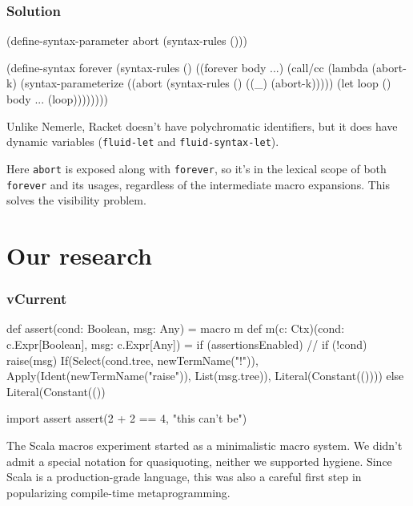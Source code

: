 \documentclass[hyperref={bookmarks=false}]{beamer}
\begin{document}
\begin{frame}[fragile]
\frametitle{Solution}

\begin{lstlistinglike}
\begin{semiverbatim}
(define-syntax-parameter abort (syntax-rules ()))

(define-syntax forever
  (syntax-rules ()
    ((forever body ...)
     (call/cc
      (lambda (abort-k)
        (syntax-parameterize
            ((abort (syntax-rules () ((_) (abort-k)))))
          (let loop () body ... (loop))))))))
\end{semiverbatim}
\end{lstlistinglike}

Unlike Nemerle, Racket doesn't have polychromatic identifiers, but
it does have dynamic variables (\texttt{fluid-let} and \texttt{fluid-syntax-let}).

Here \texttt{abort} is exposed along with \texttt{forever}, so it's in the lexical scope
of both \texttt{forever} and its usages, regardless of the intermediate macro expansions.
This solves the visibility problem.
\end{frame}

\section{Our research}

\begin{frame}[fragile]
\frametitle{vCurrent}

\begin{lstlistinglike}
\begin{semiverbatim}
def assert(cond: Boolean, msg: Any) = macro m
def m(c: Ctx)(cond: c.Expr[Boolean], msg: c.Expr[Any]) =
  if (assertionsEnabled)
    // if (!cond) raise(msg)
    If(Select(cond.tree, newTermName("!")),
        Apply(Ident(newTermName("raise")), List(msg.tree)),
        Literal(Constant(())))
  else
    Literal(Constant(())

import assert
assert(2 + 2 == 4, "this can't be")
\end{semiverbatim}
\end{lstlistinglike}

The Scala macros experiment started as a minimalistic macro system.
We didn't admit a special notation for quasiquoting, neither we supported hygiene.
Since Scala is a production-grade language, this was also a careful first step
in popularizing compile-time metaprogramming.
\end{frame}
\end{document}
